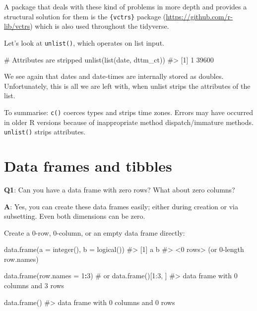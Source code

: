 \documentclass[
]{krantz}
\makeatletter
\newenvironment{Shaded}{\begin{snugshade}}{\end{snugshade}}
\newcommand{\CommentTok}[1]{\textcolor[rgb]{0.56,0.35,0.01}{\textit{#1}}}
\newcommand{\DataTypeTok}[1]{\textcolor[rgb]{0.13,0.29,0.53}{#1}}
\newcommand{\DecValTok}[1]{\textcolor[rgb]{0.00,0.00,0.81}{#1}}
\newcommand{\KeywordTok}[1]{\textcolor[rgb]{0.13,0.29,0.53}{\textbf{#1}}}
\newcommand{\NormalTok}[1]{#1}
\newcommand{\OperatorTok}[1]{\textcolor[rgb]{0.81,0.36,0.00}{\textbf{#1}}}
\renewcommand{\href}[2]{#2 (\url{#1})}
\newenvironment{kframe}{%
\medskip{}
\setlength{\fboxsep}{.8em}
 \def\at@end@of@kframe{}%
 \ifinner\ifhmode%
  \def\at@end@of@kframe{\end{minipage}}%
  \begin{minipage}{\columnwidth}%
 \fi\fi%
 \def\FrameCommand##1{\hskip\@totalleftmargin \hskip-\fboxsep
 \colorbox{shadecolor}{##1}\hskip-\fboxsep
     \hskip-\linewidth \hskip-\@totalleftmargin \hskip\columnwidth}%
 \MakeFramed {\advance\hsize-\width
   \@totalleftmargin\z@ \linewidth\hsize
   \@setminipage}}%
 {\par\unskip\endMakeFramed%
 \at@end@of@kframe}
\renewenvironment{Shaded}{\begin{kframe}}{\end{kframe}}
\renewcommand{\KeywordTok} [1]{\textcolor[rgb]{0.00,0.44,0.13}{{#1}}}
\renewcommand{\DataTypeTok}[1]{\textcolor[rgb]{0.56,0.13,0.00}{{#1}}}
\renewcommand{\DecValTok}  [1]{\textcolor[rgb]{0.25,0.63,0.44}{{#1}}}
\renewcommand{\CommentTok} [1]{\textcolor[rgb]{0.38,0.63,0.69}{{#1}}}
\renewcommand{\NormalTok}  [1]{{#1}}
\makeatother
\begin{document}
A package that deals with these kind of problems in more depth and provides a structural solution for them is the \href{https://github.com/r-lib/vctrs}{\texttt{\{vctrs\}} package} which is also used throughout the tidyverse.

Let's look at \texttt{unlist()}, which operates on list input.

\begin{Shaded}
\begin{Highlighting}[]
\CommentTok{# Attributes are stripped}
\KeywordTok{unlist}\NormalTok{(}\KeywordTok{list}\NormalTok{(date, dttm_ct))  }
\CommentTok{#> [1]     1 39600}
\end{Highlighting}
\end{Shaded}

We see again that dates and date-times are internally stored as doubles. Unfortunately, this is all we are left with, when unlist strips the attributes of the list.

To summarise: \texttt{c()} coerces types and strips time zones. Errors may have occurred in older R versions because of inappropriate method dispatch/immature methods. \texttt{unlist()} strips attributes.

\hypertarget{data-frames-and-tibbles}{%
\section{Data frames and tibbles}\label{data-frames-and-tibbles}}

\textbf{{Q1}}: Can you have a data frame with zero rows? What about zero columns?

\textbf{{A}}: Yes, you can create these data frames easily; either during creation or via subsetting. Even both dimensions can be zero.

Create a 0-row, 0-column, or an empty data frame directly:

\begin{Shaded}
\begin{Highlighting}[]
\KeywordTok{data.frame}\NormalTok{(}\DataTypeTok{a =} \KeywordTok{integer}\NormalTok{(), }\DataTypeTok{b =} \KeywordTok{logical}\NormalTok{())}
\CommentTok{#> [1] a b}
\CommentTok{#> <0 rows> (or 0-length row.names)}

\KeywordTok{data.frame}\NormalTok{(}\DataTypeTok{row.names =} \DecValTok{1}\OperatorTok{:}\DecValTok{3}\NormalTok{)  }\CommentTok{# or data.frame()[1:3, ]}
\CommentTok{#> data frame with 0 columns and 3 rows}

\KeywordTok{data.frame}\NormalTok{()}
\CommentTok{#> data frame with 0 columns and 0 rows}
\end{Highlighting}
\end{Shaded}
\end{document}
